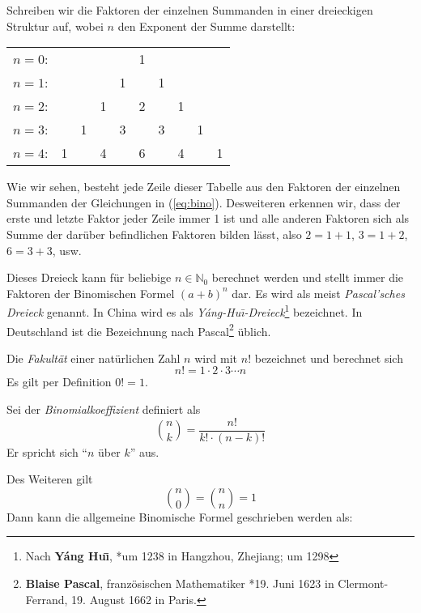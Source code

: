 \begin{definition}
Schreiben wir die Faktoren der einzelnen Summanden in einer dreieckigen Struktur auf, wobei $n$ den Exponent der Summe darstellt:

\begin{center}
\begin{tabular}{rccccccccc} 
$n=0$:& & & & & 1\\
\noalign{\smallskip} $n=1$:& & & & 1 & & 1\\
\noalign{\smallskip} $n=2$:& & & 1 & & 2 & & 1\\
\noalign{\smallskip} $n=3$:& & 1 & & 3 & & 3 & & 1\\
\noalign{\smallskip} $n=4$:& 1 & & 4 & & 6 & & 4 & & 1
\end{tabular}
\end{center}
Wie wir sehen, besteht jede Zeile dieser Tabelle aus den Faktoren der einzelnen Summanden der Gleichungen in (\ref{eq:bino}). Desweiteren erkennen wir, dass der erste und letzte Faktor jeder Zeile immer 1 ist und alle anderen Faktoren sich als Summe der darüber befindlichen Faktoren bilden lässt, also $2=1+1$, $3=1+2$, $6=3+3$, usw.
\end{definition}

Dieses Dreieck kann für beliebige $n\in \mathbb{N}_0$ berechnet werden und stellt immer die Faktoren der Binomischen Formel $(a+b)^n$ dar. Es wird als meist \textsl{Pascal'sches Dreieck} genannt. In China wird es als \textsl{Yáng-Hu\=\i-Dreieck}\footnote{Nach \textbf{Yáng Hu\=\i}, *um 1238 in Hangzhou, Zhejiang;  um 1298} bezeichnet. In Deutschland ist die Bezeichnung nach Pascal\footnote{\textbf{Blaise Pascal}, französischen Mathematiker *19. Juni 1623 in Clermont-Ferrand, 19. August 1662 in Paris.} üblich.

\begin{definition}
Die \emph{Fakultät} einer natürlichen Zahl $n$ wird mit $n!$ bezeichnet und berechnet sich
\[
n! = 1\cdot 2\cdot 3 \dotsm n
\]
Es gilt per Definition $0! =1$.
\end{definition}

\begin{definition}
Sei der \textsl{Binomialkoeffizient} definiert als 
\[
	\binom{n}{k} = \frac{n!}{k!\cdot (n-k)!}
\]
Er spricht sich "`$n$ über $k$"' aus.
\end{definition}

Des Weiteren gilt 
\[
\binom{n}{0} = \binom{n}{n} = 1
\]
Dann kann die allgemeine Binomische Formel geschrieben werden als:

